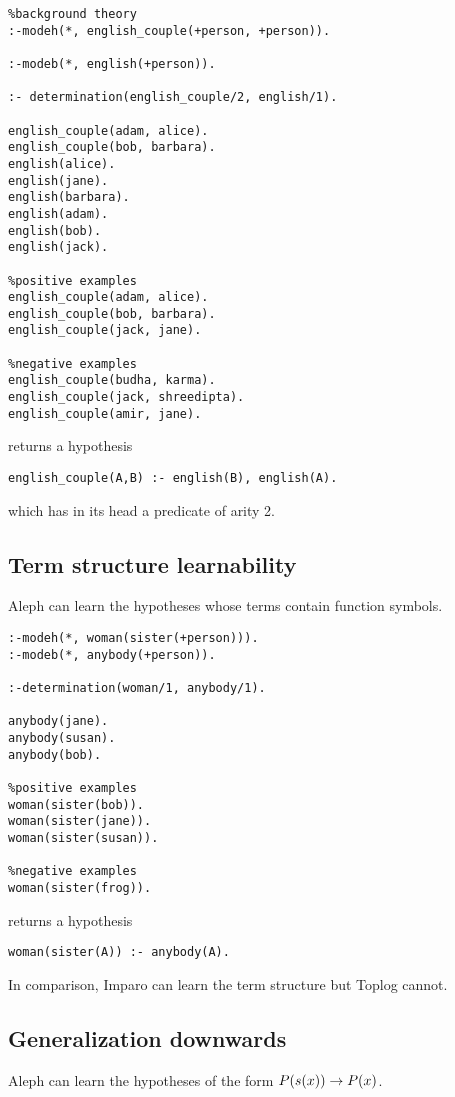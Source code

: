\begin{lstlisting}
%background theory
:-modeh(*, english_couple(+person, +person)).

:-modeb(*, english(+person)).

:- determination(english_couple/2, english/1).

english_couple(adam, alice).
english_couple(bob, barbara).
english(alice).
english(jane).
english(barbara).
english(adam).
english(bob).
english(jack).

%positive examples
english_couple(adam, alice).
english_couple(bob, barbara).
english_couple(jack, jane).

%negative examples
english_couple(budha, karma).
english_couple(jack, shreedipta).
english_couple(amir, jane).
\end{lstlisting}

returns a hypothesis

\begin{lstlisting}
english_couple(A,B) :- english(B), english(A).
\end{lstlisting} which has in its head a predicate of arity 2.

\subsection{Term structure learnability}
Aleph can learn the hypotheses whose terms contain function symbols.
\begin{lstlisting}
:-modeh(*, woman(sister(+person))).
:-modeb(*, anybody(+person)).

:-determination(woman/1, anybody/1).

anybody(jane).
anybody(susan).
anybody(bob).

%positive examples
woman(sister(bob)).
woman(sister(jane)).
woman(sister(susan)).

%negative examples
woman(sister(frog)).
\end{lstlisting}
returns a hypothesis
\begin{lstlisting}
woman(sister(A)) :- anybody(A).
\end{lstlisting}
In comparison, Imparo can learn the term structure but Toplog cannot.

\subsection{Generalization downwards}
Aleph can learn the hypotheses of the form $P(s(x)) \to P(x)$.

